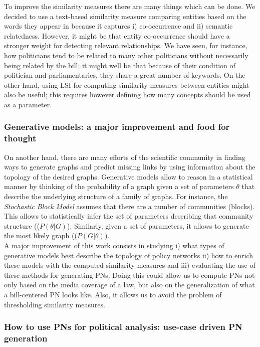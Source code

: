 To improve the similarity measures there are many things which can be done. We decided to use a text-based similarity measure comparing entities based on the words they appear in because it captures i) co-occurrence and ii) semantic relatedness. However, it might be that entity co-occurrence should have a stronger weight for detecting relevant relationships. We have seen, for instance, how politicians tend to be related to many other politicians without necessarily being related by the bill; it might well be that because of their condition of politician and parliamentaries, they share a great number of keywords. On the other hand, using LSI for computing similarity measures between entities might also be useful; this requires however defining how many concepts should be used as a parameter. \\

\subsubsection{Generative models: a major improvement and food for thought}

On another hand, there are many efforts of the scientific community in finding ways to generate graphs and predict missing links by using information about the topology of the desired graphs. Generative models allow to reason in a statistical manner by thinking of the probability of a graph given a set of parameters $\theta$ that describe the underlying structure of a family of graphs. For instance, the \emph{Stochastic Block Model} assumes that there are a number of communities (blocks). This allows to statistically infer the set of parameters describing that community structure (($P(\theta|G)$). Similarly, given a set of parameters, it allows to generate the most likely graph (($P(G|\theta)$).\\

A major improvement of this work consists in studying i) what types of generative models best describe the topology of policy networks ii) how to enrich these models with the computed similarity measures and iii) evaluating the use of these methods for generating PNs. Doing this could allow us to compute PNs not only based on the media coverage of a law, but also on the generalization of what a bill-centered PN looks like. Also, it allows us to avoid the problem of thresholding similarity measures.

\subsubsection{How to use PNs for political analysis: use-case driven PN generation}


